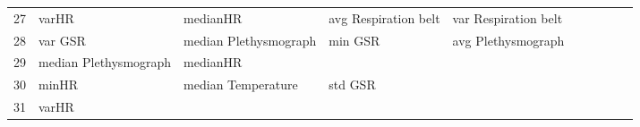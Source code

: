 \begin{landscape}
\begin{table}[]
\begin{tabular}{l|llllllll}
27       & varHR                   & medianHR              & avg Respiration belt    & var Respiration belt    &                         &                       &                      &          &                      &        \\
28       & var GSR                 & median Plethysmograph & min GSR                 & avg Plethysmograph      &                         &                       &                      &          &                      &        \\
29       & median Plethysmograph   & medianHR              &                         &                         &                         &                       &                      &          &                      &        \\
30       & minHR                   & median Temperature    & std GSR                 &                         &                         &                       &                      &          &                      &        \\
31       & varHR                   &                       &                         &                         &                         &                       &                      &          &                      &        \\
\end{tabular}
\end{table}
\end{landscape}
\clearpage

